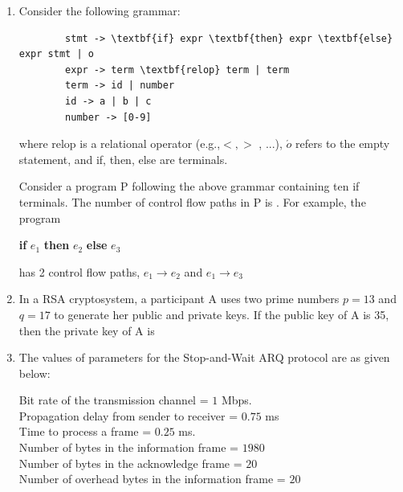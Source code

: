 \documentclass[a4paper, 11pt]{article}
\begin{document}
\begin{enumerate}
    \hfill{}

    \item Consider the following grammar:
    
    \begin{verbatim}
        stmt -> \textbf{if} expr \textbf{then} expr \textbf{else} expr stmt | o
        expr -> term \textbf{relop} term | term
        term -> id | number
        id -> a | b | c
        number -> [0-9]
    \end{verbatim}
    
    where relop is a relational operator (e.g.,$<, >$ , ...), $\acute{o}$ refers to the empty statement, and if, then, else are terminals.
    
    Consider a program P following the above grammar containing ten if terminals. The number of control flow paths in P is  \underline{\hspace{2cm}}. For example, the program
    \begin{center}
        
        \textbf{if} $e_1$ \textbf{then} $e_2$ \textbf{else} $e_3$
    \end{center} 
    has 2 control flow paths, $e_1 \rightarrow e_2 $ and $ e_1 \rightarrow e_3$
    
    \hfill{}
    
    \item In a RSA cryptosystem, a participant A uses two prime numbers $p=13$ and $q=17$ to generate her public and private keys. If the public key of A is 35, then the private key of A is \underline{\hspace{2cm}}

    \hfill{}

    \item The values of parameters for the Stop-and-Wait ARQ protocol are as given below:
    
    Bit rate of the transmission channel = $1$ Mbps.\\
    Propagation delay from sender to receiver = $0.75$ ms\\
    Time to process a frame = $0.25$ ms.\\
    Number of bytes in the information frame = $1980$\\
    Number of bytes in the acknowledge frame = $20$\\
    Number of overhead bytes in the information frame = $20$\\
    

\end{enumerate}
\end{document}
